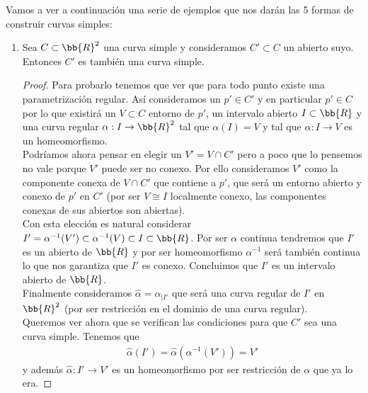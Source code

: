 \begin{ejemplo}\label{ej:construccion} Vamos a ver a continuación una serie de ejemplos que nos darán las 5 formas de construir curvas simples:
    \begin{enumerate}
        \item\label{ej:abierto} Sea $C\subset \bb{R}^2$ una curva simple y consideramos $C'\subset C$ un abierto suyo. Entonces $C'$ es también una curva simple.
        \begin{proof}
            Para probarlo tenemos que ver que para todo punto existe una parametrización regular. Así consideramos un $p'\in C'$ y en particular $p'\in C$ por lo que existirá un $V\subset C$ entorno de $p'$, un intervalo abierto $I\subset \bb{R}$ y una curva regular $\alpha : I \to \bb{R}^2$ tal que $\alpha(I)=V$ y tal que $\alpha : I \to V$ es un homeomorfismo.\\

            Podríamos ahora pensar en elegir un $V'=V\cap C'$ pero a poco que lo pensemos no vale porque $V'$ puede ser no conexo. Por ello consideramos $V'$ como la componente conexa de $V\cap C'$ que contiene a $p'$, que será un entorno abierto y conexo de $p'$ en $C'$ (por ser $V\cong I$ localmente conexo, las componentes conexas de sus abiertos son abiertas).\\

            Con esta elección es natural considerar $I'=\alpha^{-1}(V') \subset \alpha^{-1}(V) \subset I \subset \bb{R}$. Por ser $\alpha$ continua tendremos que $I'$ es un abierto de $\bb{R}$ y por ser homeomorfismo $\alpha^{-1}$ será también continua lo que nos garantiza que $I'$ es conexo. Concluimos que $I'$ es un intervalo abierto de $\bb{R}$.\\

            Finalmente consideramos $\hat{\alpha} = \alpha_{|I'}$ que será una curva regular de $I'$ en $\bb{R}^2$ (por ser restricción en el dominio de una curva regular). \\
            
            Queremos ver ahora que se verifican las condiciones para que $C'$ sea una curva simple. Tenemos que 
            \begin{gather*}
                \hat{\alpha}(I') = \hat{\alpha} (\alpha^{-1} (V')) = V'
            \end{gather*}
            y además $\hat{\alpha}:I'\to V'$ es un homeomorfismo por ser restricción de $\alpha$ que ya lo era.
        \end{proof}


\end{enumerate}
\end{ejemplo}
